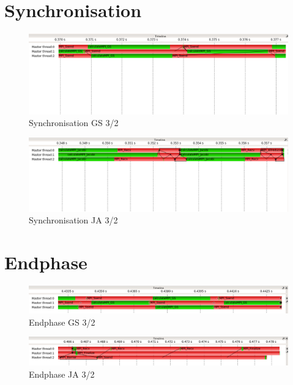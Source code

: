 \documentclass[a4paper,10pt]{article}
\begin{document}
\section{Synchronisation}
\begin{figure}
 \caption{Synchronisation GS 3/2}
 \includegraphics[width=14cm]{c_sync_GS_3x2.png}
\end{figure}
\begin{figure}
 \caption{Synchronisation JA 3/2}
 \includegraphics[width=14cm]{c_sync_JA_3x2.png}
\end{figure}
\section{Endphase}
\begin{figure}
 \caption{Endphase GS 3/2}
 \includegraphics[width=14cm]{c_end_GS_3x2.png}
\end{figure}
\begin{figure}
 \caption{Endphase JA 3/2}
 \includegraphics[width=14cm]{c_end_JA_3x2.png}
\end{figure}
\end{document}
